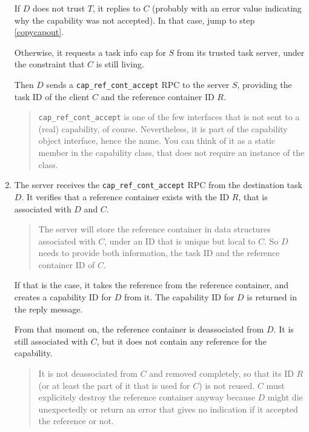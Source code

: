 \documentclass[9pt,a4paper]{extarticle}
\newenvironment{comment}{\footnotesize \begin{quote}}{\end{quote}}
\begin{document}
\begin{enumerate}
  If $D$ does not trust $T$, it replies to $C$ (probably with an error
  value indicating why the capability was not accepted).  In that
  case, jump to step \ref{copycapout}.
  
  Otherwise, it requests a task info cap for $S$ from its trusted task
  server, under the constraint that $C$ is still living.
  
  Then $D$ sends a \verb/cap_ref_cont_accept/ RPC to the server $S$,
  providing the task ID of the client $C$ and the reference container
  ID $R$.

\begin{comment}
  \verb/cap_ref_cont_accept/ is one of the few interfaces that is not
  sent to a (real) capability, of course.  Nevertheless, it is part of
  the capability object interface, hence the name.  You can think of
  it as a static member in the capability class, that does not require
  an instance of the class.
\end{comment}
  
\item The server receives the \verb/cap_ref_cont_accept/ RPC from the
  destination task $D$.  It verifies that a reference container exists
  with the ID $R$, that is associated with $D$ and $C$.
  
  \begin{comment}
    The server will store the reference container in data structures
    associated with $C$, under an ID that is unique but local to $C$.
    So $D$ needs to provide both information, the task ID and the
    reference container ID of $C$.
  \end{comment}

  If that is the case, it takes the reference from the reference
  container, and creates a capability ID for $D$ from it.  The
  capability ID for $D$ is returned in the reply message.
  
  From that moment on, the reference container is deassociated from
  $D$.  It is still associated with $C$, but it does not contain any
  reference for the capability.

  \begin{comment}
    It is not deassociated from $C$ and removed completely, so that
    its ID $R$ (or at least the part of it that is used for $C$) is
    not reused.  $C$ must explicitely destroy the reference container
    anyway because $D$ might die unexpectedly or return an error that
    gives no indication if it accepted the reference or not.
  \end{comment}
  

\end{enumerate}
\end{document}
